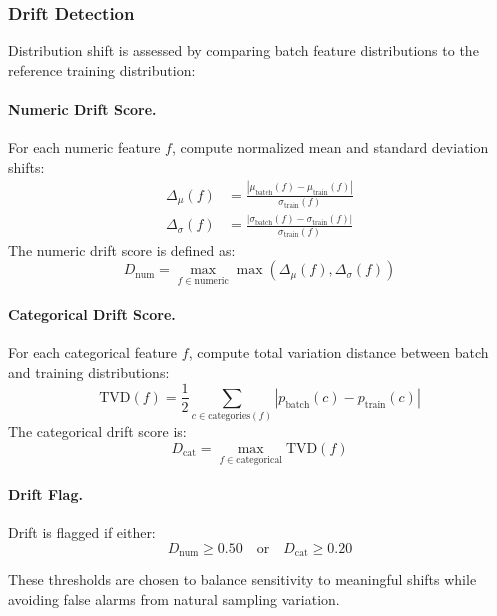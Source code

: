 \documentclass[11pt,a4paper]{article}
\begin{document}
\subsubsection{Drift Detection}

Distribution shift is assessed by comparing batch feature distributions to the reference training distribution:

\paragraph{Numeric Drift Score.}
For each numeric feature $f$, compute normalized mean and standard deviation shifts:
\begin{align}
\Delta_{\mu}(f) &= \frac{|\mu_{\text{batch}}(f) - \mu_{\text{train}}(f)|}{\sigma_{\text{train}}(f)} \\
\Delta_{\sigma}(f) &= \frac{|\sigma_{\text{batch}}(f) - \sigma_{\text{train}}(f)|}{\sigma_{\text{train}}(f)}
\end{align}
The numeric drift score is defined as:
\begin{equation}
D_{\text{num}} = \max_{f \in \text{numeric}} \max(\Delta_{\mu}(f), \Delta_{\sigma}(f))
\end{equation}

\paragraph{Categorical Drift Score.}
For each categorical feature $f$, compute total variation distance between batch and training distributions:
\begin{equation}
\text{TVD}(f) = \frac{1}{2} \sum_{c \in \text{categories}(f)} |p_{\text{batch}}(c) - p_{\text{train}}(c)|
\end{equation}
The categorical drift score is:
\begin{equation}
D_{\text{cat}} = \max_{f \in \text{categorical}} \text{TVD}(f)
\end{equation}

\paragraph{Drift Flag.}
Drift is flagged if either:
\begin{equation}
D_{\text{num}} \geq 0.50 \quad \text{or} \quad D_{\text{cat}} \geq 0.20
\end{equation}

These thresholds are chosen to balance sensitivity to meaningful shifts while avoiding false alarms from natural sampling variation.
\end{document}
